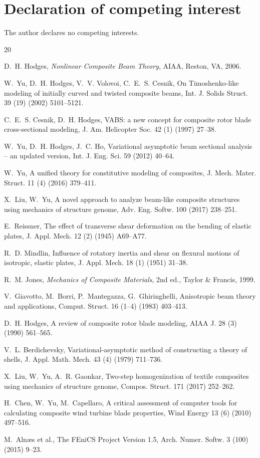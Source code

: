 \documentclass[preprint,12pt]{elsarticle}
\begin{document}
\section*{Declaration of competing interest}
The author declares no competing interests.

\begin{thebibliography}{20}

 D.~H. Hodges,
\emph{Nonlinear Composite Beam Theory}, AIAA, Reston, VA, 2006.

 W.~Yu, D.~H. Hodges, V.~V. Volovoi, C.~E.~S. Cesnik,
On Timoshenko-like modeling of initially curved and twisted composite beams,
Int. J. Solids Struct. 39 (19) (2002) 5101--5121.

 C.~E.~S. Cesnik, D.~H. Hodges,
VABS: a new concept for composite rotor blade cross-sectional modeling,
J. Am. Helicopter Soc. 42 (1) (1997) 27--38.

 W.~Yu, D.~H. Hodges, J.~C. Ho,
Variational asymptotic beam sectional analysis -- an updated version,
Int. J. Eng. Sci. 59 (2012) 40--64.

 W.~Yu,
A unified theory for constitutive modeling of composites,
J. Mech. Mater. Struct. 11 (4) (2016) 379--411.

 X.~Liu, W.~Yu,
A novel approach to analyze beam-like composite structures using mechanics of
structure genome, Adv. Eng. Softw. 100 (2017) 238--251.

 E.~Reissner,
The effect of transverse shear deformation on the bending of elastic plates,
J. Appl. Mech. 12 (2) (1945) A69--A77.

 R.~D. Mindlin,
Influence of rotatory inertia and shear on flexural motions of isotropic,
elastic plates, J. Appl. Mech. 18 (1) (1951) 31--38.

 R.~M. Jones,
\emph{Mechanics of Composite Materials}, 2nd ed., Taylor \& Francis, 1999.

 V.~Giavotto, M.~Borri, P.~Mantegazza, G.~Ghiringhelli,
Anisotropic beam theory and applications, Comput. Struct. 16 (1--4) (1983)
403--413.

 D.~H. Hodges,
A review of composite rotor blade modeling,
AIAA J. 28 (3) (1990) 561--565.

 V.~L. Berdichevsky,
Variational-asymptotic method of constructing a theory of shells,
J. Appl. Math. Mech. 43 (4) (1979) 711--736.

 X.~Liu, W.~Yu, A.~R. Gaonkar,
Two-step homogenization of textile composites using mechanics of structure
genome, Compos. Struct. 171 (2017) 252--262.

 H.~Chen, W.~Yu, M.~Capellaro,
A critical assessment of computer tools for calculating composite wind turbine
blade properties, Wind Energy 13 (6) (2010) 497--516.

 M.~Aln\ae s et al.,
The FEniCS Project Version 1.5, Arch. Numer. Softw. 3 (100) (2015) 9--23.

\end{thebibliography}
\end{document}
